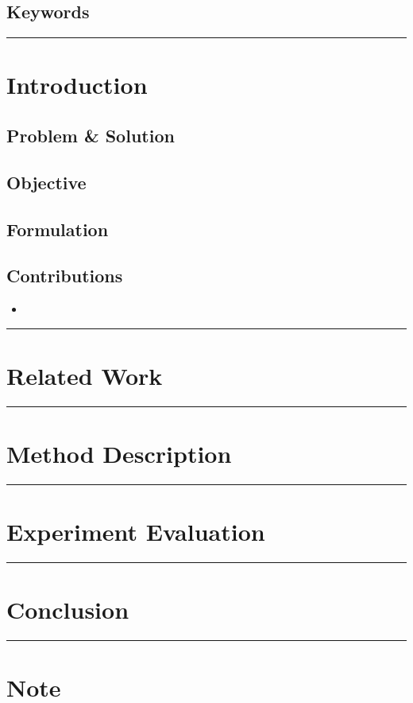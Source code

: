 \documentclass[letterpaper,10pt]{article}
\begin{document}
\subsection{Keywords}


\begin{center}\rule{\textwidth}{1pt}\end{center}
\section{Introduction}

\subsection{Problem \& Solution}


\subsection{Objective}


\subsection{Formulation}


\subsection{Contributions}
\begin{itemize}
	\item 
\end{itemize}

\begin{center}\rule{\textwidth}{1pt}\end{center}
\section{Related Work}


\begin{center}\rule{\textwidth}{1pt}\end{center}
\section{Method Description}


\begin{center}\rule{\textwidth}{1pt}\end{center}
\section{Experiment Evaluation}


\begin{center}\rule{\textwidth}{1pt}\end{center}
\section{Conclusion}


\begin{center}\rule{\textwidth}{1pt}\end{center}
\section{Note}
\end{document}
